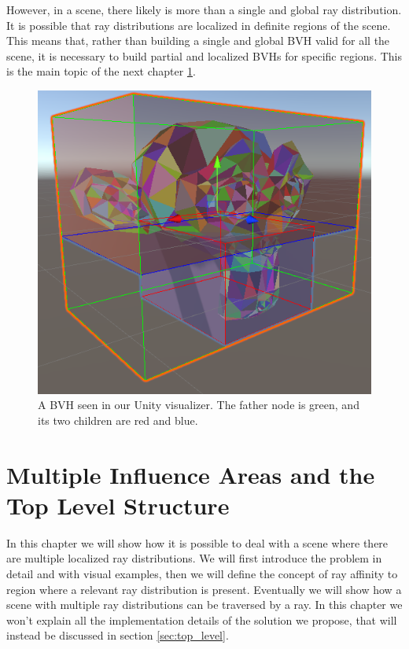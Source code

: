 \documentclass{PoliMi_MasterThesis}
\begin{document}
However, in a scene, there likely is more than a single and global ray distribution. It is possible that ray distributions are localized in definite regions of the scene. This means that, rather than building a single and global BVH valid for all the scene, it is necessary to build partial and localized BVHs for specific regions. This is the main topic of the next chapter \ref{ch:multi_influence_areas}.

\begin{figure}[H]
    \centering
    \includegraphics[width=\textwidth]{Images/suzanne_root_visualizer.png}
    \caption{A BVH seen in our Unity visualizer. The father node is green, and its two children are red and blue.}
    \label{fig:suzanne_root_visualizer}
\end{figure}

\chapter{Multiple Influence Areas and the Top Level Structure} \label{ch:multi_influence_areas}
In this chapter we will show how it is possible to deal with a scene where there are multiple localized ray distributions. We will first introduce the problem in detail and with visual examples, then we will define the concept of ray affinity to region where a relevant ray distribution is present. Eventually we will show how a scene with multiple ray distributions can be traversed by a ray. In this chapter we won't explain all the implementation details of the solution we propose, that will instead be discussed in section \ref{sec:top_level}.
\end{document}
